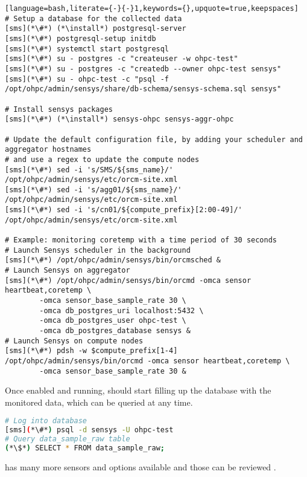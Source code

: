 \begin{lstlisting}[language=bash,literate={-}{-}1,keywords={},upquote=true,keepspaces]
# Setup a database for the collected data
[sms](*\#*) (*\install*) postgresql-server
[sms](*\#*) postgresql-setup initdb
[sms](*\#*) systemctl start postgresql
[sms](*\#*) su - postgres -c "createuser -w ohpc-test"
[sms](*\#*) su - postgres -c "createdb --owner ohpc-test sensys"
[sms](*\#*) su - ohpc-test -c "psql -f /opt/ohpc/admin/sensys/share/db-schema/sensys-schema.sql sensys"

# Install sensys packages
[sms](*\#*) (*\install*) sensys-ohpc sensys-aggr-ohpc

# Update the default configuration file, by adding your scheduler and aggregator hostnames
# and use a regex to update the compute nodes
[sms](*\#*) sed -i 's/SMS/${sms_name}/' /opt/ohpc/admin/sensys/etc/orcm-site.xml
[sms](*\#*) sed -i 's/agg01/${sms_name}/' /opt/ohpc/admin/sensys/etc/orcm-site.xml
[sms](*\#*) sed -i 's/cn01/${compute_prefix}[2:00-49]/' /opt/ohpc/admin/sensys/etc/orcm-site.xml

# Example: monitoring coretemp with a time period of 30 seconds
# Launch Sensys scheduler in the background
[sms](*\#*) /opt/ohpc/admin/sensys/bin/orcmsched &
# Launch Sensys on aggregator
[sms](*\#*) /opt/ohpc/admin/sensys/bin/orcmd -omca sensor heartbeat,coretemp \
        -omca sensor_base_sample_rate 30 \
        -omca db_postgres_uri localhost:5432 \
        -omca db_postgres_user ohpc-test \
        -omca db_postgres_database sensys &
# Launch Sensys on compute nodes
[sms](*\#*) pdsh -w $compute_prefix[1-4] /opt/ohpc/admin/sensys/bin/orcmd -omca sensor heartbeat,coretemp \
        -omca sensor_base_sample_rate 30 &
\end{lstlisting}

\noindent  Once enabled and running, \Sensys{} should start filling up the
database with the monitored data, which can be queried at any time.

\begin{lstlisting}[language=bash,keywords={},upquote=true]
# Log into database
[sms](*\#*) psql -d sensys -U ohpc-test
# Query data_sample_raw table
(*\$*) SELECT * FROM data_sample_raw;
\end{lstlisting}

\noindent \Sensys{} has many more sensors and options available and those can be
reviewed \href{https://intel-ctrlsys.github.io/sensys}{\color{blue}{here}}.

